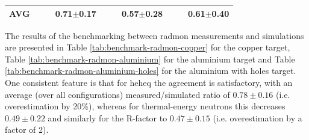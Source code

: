 \documentclass[encoding=utf8,british]{tumphthesis}
\begin{document}
\begin{table}[H]
\begin{subtable}{1\textwidth}
{\begin{tabular}{|l|llr|llr|llr|}
\textbf{AVG}                             &                                                      &                                                       & \textbf{0.71$\pm$0.17}                           &                                                      &                                                       & \textbf{0.57$\pm$0.28}                           &                                                      &                                                       & \textbf{0.61$\pm$0.40}                          
\\ \hline
\end{tabular}}
\end{subtable}

\end{table}




The results of the benchmarking between \acrshort{radmon} measurements and simulations are presented in Table \ref{tab:benchmark-radmon-copper} for the copper target, Table \ref{tab:benchmark-radmon-aluminium} for the aluminium target and Table \ref{tab:benchmark-radmon-aluminium-holes} for the aluminium with holes target. One consistent feature is that for \acrshort{heheq} the agreement is satisfactory, with an average (over all configurations) measured/simulated ratio of $0.78\pm0.16$ (i.e. overestimation by 20\%), whereas for thermal-energy neutrons this decreases $0.49\pm0.22$ and similarly for the R-factor to $0.47\pm0.15$ (i.e. overestimation by a factor of 2).  
\end{document}
